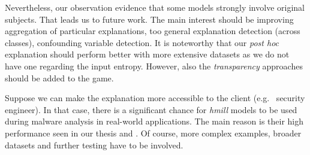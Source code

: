 Nevertheless, our observation evidence that some models strongly involve original subjects. That leads us to future work. The main interest should be improving aggregation of particular explanations, too general explanation detection (across classes), confounding variable detection. It is noteworthy that our \emph{post hoc} explanation should perform better with more extensive datasets as we do not have one regarding the input entropy. However, also the \emph{transparency} approaches should be added to the game. 

Suppose we can make the explanation more accessible to the client (e.g. \ security engineer). In that case, there is a significant chance for \emph{hmill} models to be used during malware analysis in real-world applications. The main reason is their high performance seen in our thesis and \cite{Mandlik2020} . Of course, more complex examples, broader datasets and further testing have to be involved.


